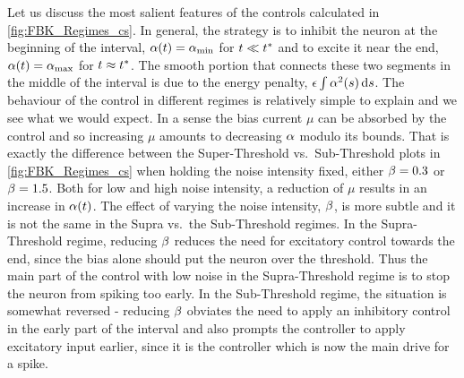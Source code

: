 \documentclass[12pt]{iopart}
\begin{document}
Let us discuss the most salient features of the controls calculated in
\cref{fig:FBK_Regimes_cs}. In general, the strategy is to inhibit the neuron at
the beginning of the interval, ${\alpha}(t) = { {\alpha}_{\textrm{min}} }$ for $t \ll { t^* }$ and to excite it
near the end, ${\alpha}(t) = { {\alpha}_{\textrm{max}} }$ for $t \approx { t^* }$. The smooth portion that
connects these two segments in the middle of the interval is due to the energy
penalty, ${\epsilon} \int {\alpha}^2(s) \, \mathrm{d} s$. The behaviour of the control in different
regimes is relatively simple to explain and we see what we would expect. In a
sense the bias current $\mu$ can be absorbed by the control and so increasing
$\mu$ amounts to decreasing ${\alpha}$ modulo its bounds. That is exactly the
difference between the Super-Threshold vs.\ Sub-Threshold plots in
\cref{fig:FBK_Regimes_cs} when holding the noise intensity fixed, either
${\beta}=0.3$ or ${\beta}=1.5$. Both for low and high noise intensity, a reduction of $\mu$
results in an increase in ${\alpha}(t)$. 
The effect of varying the noise intensity, ${\beta}$, is more subtle and it is not
the same in the Supra vs.\ the Sub-Threshold regimes. In the
Supra-Threshold regime, reducing ${\beta}$ reduces the need for
excitatory control towards the end, since the bias alone should put the neuron
over the threshold. Thus the main part of the control with low noise in the
Supra-Threshold regime is to stop the neuron from spiking too early. In the
Sub-Threshold regime, the situation is somewhat reversed - reducing
${\beta}$ obviates the need to apply an inhibitory control in the early part of the
interval and also prompts the controller to apply excitatory input earlier,
since it is the controller which is now the main drive for a spike.
\end{document}
